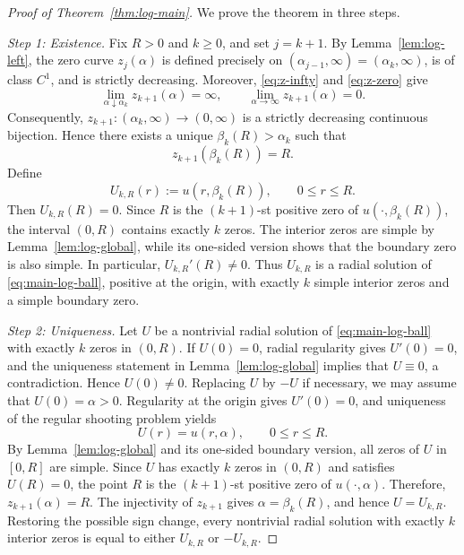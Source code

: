 \documentclass[11pt]{article}
\begin{document}
\begin{proof}[Proof of Theorem~\ref{thm:log-main}]We prove the theorem in three steps.
\mbox{}\par
\medskip
\noindent\emph{Step 1: Existence.}
Fix $R>0$ and {$k\geq0$}, and set $j=k+1$. By Lemma~\ref{lem:log-left}, the zero curve $z_j(\alpha)$ is defined precisely on $(\alpha_{j-1},\infty)=(\alpha_k,\infty)$, is of class $C^1$, and is strictly decreasing. Moreover, \eqref{eq:z-infty} and \eqref{eq:z-zero} give
 \begin{equation*}
 \lim_{\alpha\downarrow\alpha_k}z_{k+1}(\alpha)=\infty,
 \qquad
 \lim_{\alpha\to\infty}z_{k+1}(\alpha)=0.
 \end{equation*}
Consequently, $z_{k+1}:(\alpha_k,\infty)\rightarrow (0,\infty)$ is a {strictly decreasing continuous bijection}.
Hence there exists a unique $\beta_k(R)>\alpha_k$ such that
 \begin{equation*}
 z_{k+1}(\beta_k(R))=R.
 \end{equation*}
Define
\[
 U_{k,R}(r):=u(r,\beta_k(R)),
 \qquad 0\leq r\leq R.
\]
Then $U_{k,R}(R)=0$. Since $R$ is the $(k+1)$-st positive zero of $u(\cdot,\beta_k(R))$, the interval $(0,R)$ contains exactly $k$ zeros. The interior zeros are simple by Lemma~\ref{lem:log-global}, while its one-sided version shows that the boundary zero is also simple. In particular, $U_{k,R}'(R)\ne0$. Thus $U_{k,R}$ is a radial solution of \eqref{eq:main-log-ball}, positive at the origin, with exactly $k$
simple interior zeros and a simple boundary zero.

\medskip
\noindent\emph{Step 2: Uniqueness.}
Let $U$ be a nontrivial radial solution of \eqref{eq:main-log-ball} with exactly $k$ zeros in $(0,R)$. If
$U(0)=0$, radial regularity gives $U'(0)=0$, and the uniqueness statement in Lemma~\ref{lem:log-global} implies that $U\equiv0$, a contradiction. Hence $U(0)\ne0$. Replacing $U$ by $-U$ if necessary, we may assume that $U(0)=\alpha>0$. Regularity at the origin gives $U'(0)=0$, and uniqueness of the
regular shooting problem yields
\[
 U(r)=u(r,\alpha),
 \qquad 0\leq r\leq R.
\]
By Lemma~\ref{lem:log-global} and its one-sided boundary version, all
zeros of $U$ in $[0,R]$ are simple. Since $U$ has exactly $k$ zeros
in $(0,R)$ and satisfies $U(R)=0$, the point $R$ is the $(k+1)$-st
positive zero of $u(\cdot,\alpha)$. Therefore, $z_{k+1}(\alpha)=R$.
The injectivity of $z_{k+1}$ gives $\alpha=\beta_k(R)$,
and hence $U=U_{k,R}$. Restoring the possible sign change, every
{nontrivial radial solution with exactly $k$ interior zeros is
equal to either $U_{k,R}$ or $-U_{k,R}$.}



\end{proof}
\end{document}
